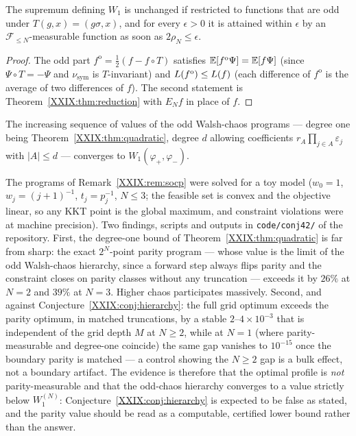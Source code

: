 \begin{proposition}\label{XXIX:prop:structure}
The supremum defining $W_1$ is unchanged if restricted to functions that are odd under
$T(g,x)=(g\sigma,x)$, and for every $\epsilon>0$ it is attained within $\epsilon$ by an
$\mathcal F_{\le N}$-measurable function as soon as $2\rho_N\le\epsilon$.
\end{proposition}

\begin{proof}
The odd part $f^{\mathrm o}=\tfrac12(f-f\circ T)$ satisfies
$\mathbb{E}[f^{\mathrm o}\Psi]=\mathbb{E}[f\Psi]$ (since $\Psi\circ T=-\Psi$ and $\nu_{\mathrm{sym}}$ is
$T$-invariant) and $L(f^{\mathrm o})\le L(f)$ (each difference of $f^{\mathrm o}$ is
the average of two differences of $f$). The second statement is
Theorem~\ref{XXIX:thm:reduction} with $E_Nf$ in place of $f$.
\end{proof}

\begin{conjecture}\label{XXIX:conj:hierarchy}
The increasing sequence of values of the odd Walsh-chaos programs --- degree one being
Theorem~\ref{XXIX:thm:quadratic}, degree $d$ allowing coefficients
$r_A\prod_{j\in A}\varepsilon_j$ with $|A|\le d$ --- converges to $W_1(\varphi_+,\varphi_-)$.
\end{conjecture}

\begin{remark}\label{XXIX:rem:numerics}
The programs of Remark~\ref{XXIX:rem:socp} were solved for a toy model ($w_0=1$,
$w_j=(j+1)^{-1}$, $t_j=p_j^{-1}$, $N\le3$; the feasible set is convex and the objective
linear, so any KKT point is the global maximum, and constraint violations were at machine
precision). Two findings, scripts and outputs in \texttt{code/conj42/} of the repository.
First, the degree-one bound of Theorem~\ref{XXIX:thm:quadratic} is far from sharp: the exact
$2^N$-point parity program --- whose value is the limit of the odd Walsh-chaos hierarchy,
since a forward step always flips parity and the constraint closes on parity classes
without any truncation --- exceeds it by $26\%$ at $N=2$ and $39\%$ at $N=3$. Higher
chaos participates massively. Second, and against Conjecture~\ref{XXIX:conj:hierarchy}: the
full grid optimum exceeds the parity optimum, in matched truncations, by a stable
$2$--$4\times10^{-3}$ that is independent of the grid depth $M$ at $N\ge2$, while at
$N=1$ (where parity-measurable and degree-one coincide) the same gap vanishes to
$10^{-15}$ once the boundary parity is matched --- a control showing the $N\ge2$ gap is a
bulk effect, not a boundary artifact. The evidence is therefore that the optimal profile
is \emph{not} parity-measurable and that the odd-chaos hierarchy converges to a value
strictly below $W_1^{(N)}$: Conjecture~\ref{XXIX:conj:hierarchy} is expected to be false as
stated, and the parity value should be read as a computable, certified lower bound rather
than the answer.
\end{remark}

